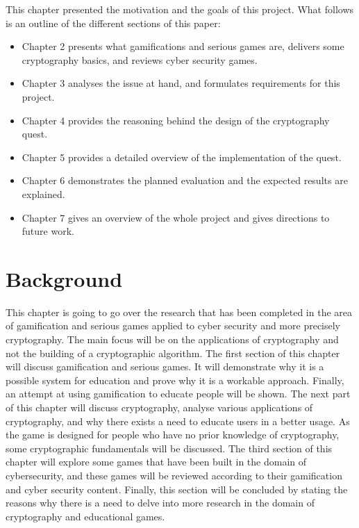 \documentclass{l4proj}
\begin{document}
This chapter presented the motivation and the goals of this project.
What follows is an outline of the different sections of this paper:
\begin{itemize}
    \item Chapter 2 presents what gamifications and serious games are, delivers some cryptography basics, and reviews cyber security games.
    \item Chapter 3 analyses the issue at hand, and formulates requirements for this project.
    \item Chapter 4 provides the reasoning behind the design of the cryptography quest.
    \item Chapter 5 provides a detailed overview of the implementation of the quest.
    \item Chapter 6 demonstrates the planned evaluation and the expected results are explained.
    \item Chapter 7 gives an overview of the whole project and gives directions to future work.
\end{itemize}

\chapter{Background}

This chapter is going to go over the research that has been completed in the area of gamification and serious games applied to cyber security and more precisely cryptography.
The main focus will be on the applications of cryptography and not the building of a cryptographic algorithm.
The first section of this chapter will discuss gamification and serious games. It will demonstrate why it is a possible system for education and prove why it is a workable approach.
Finally, an attempt at using gamification to educate people will be shown.
The next part of this chapter will discuss cryptography, analyse various applications of cryptography, and why there exists a need to educate users in a better usage.
As the game is designed for people who have no prior knowledge of cryptography, some cryptographic fundamentals will be discussed.
The third section of this chapter will explore some games that have been built in the domain of cybersecurity, and these games will be reviewed according to 
their gamification and cyber security content.
Finally, this section will be concluded by stating the reasons why there is a need to delve into more research in the domain of cryptography and educational games.
\end{document}
